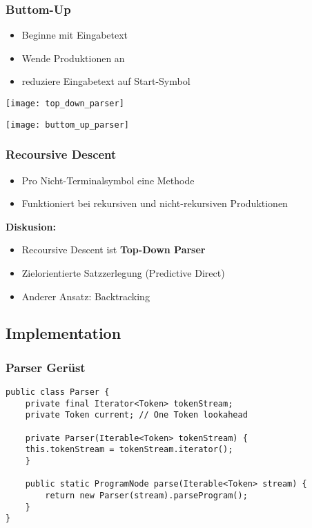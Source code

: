 \subsubsection{Buttom-Up}
\begin{itemize}[topsep=0pt]
    \itemsep -0.2em
    \item Beginne mit Eingabetext
    \item Wende Produktionen an
    \item reduziere Eingabetext auf Start-Symbol
\end{itemize}
\begin{minipage}{0,5\linewidth}
    \texttt{[image: top\_down\_parser]}
\end{minipage}
\begin{minipage}{0,5\linewidth}
    \texttt{[image: buttom\_up\_parser]}
\end{minipage}

\subsubsection{Recoursive Descent}
\begin{itemize}[topsep=0pt]
    \itemsep -0.2em
    \item Pro Nicht-Terminalsymbol eine Methode
    \item Funktioniert bei rekursiven und nicht-rekursiven Produktionen
\end{itemize}
\textbf{Diskusion:}\\
\begin{itemize}[topsep=0pt]
    \itemsep -0.2em
    \item Recoursive Descent ist \textbf{Top-Down Parser}
    \item Zielorientierte Satzzerlegung (Predictive Direct)
    \item Anderer Ansatz: Backtracking
\end{itemize}

\subsection{Implementation}
\subsubsection{Parser Gerüst}
\begin{lstlisting}
public class Parser {
    private final Iterator<Token> tokenStream;
    private Token current; // One Token lookahead

    private Parser(Iterable<Token> tokenStream) {
    this.tokenStream = tokenStream.iterator();
    }

    public static ProgramNode parse(Iterable<Token> stream) {
        return new Parser(stream).parseProgram();
    }
}
\end{lstlisting}

